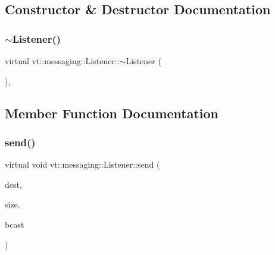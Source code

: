 \subsection{Constructor \& Destructor Documentation}
\mbox{\label{structvt_1_1messaging_1_1_listener_aee8a1131c7427cb1f8e2005605f2718c}} 
\subsubsection{\texorpdfstring{$\sim$\+Listener()}{~Listener()}}
{\footnotesize\ttfamily virtual vt\+::messaging\+::\+Listener\+::$\sim$\+Listener (\begin{DoxyParamCaption}{ }\end{DoxyParamCaption})\hspace{0.3cm}{\ttfamily [inline]}, {\ttfamily [virtual]}}



\subsection{Member Function Documentation}
\mbox{\label{structvt_1_1messaging_1_1_listener_ab2b334277feecb181a28f613c68bfc53}} 
\subsubsection{\texorpdfstring{send()}{send()}}
{\footnotesize\ttfamily virtual void vt\+::messaging\+::\+Listener\+::send (\begin{DoxyParamCaption}\item[{\hyperlink{namespacevt_a866da9d0efc19c0a1ce79e9e492f47e2}{Node\+Type}}]{dest,  }\item[{\hyperlink{namespacevt_a408e86a8c7c89309b52907dc5a513924}{Msg\+Size\+Type}}]{size,  }\item[{bool}]{bcast }\end{DoxyParamCaption})\hspace{0.3cm}{\ttfamily [pure virtual]}}




